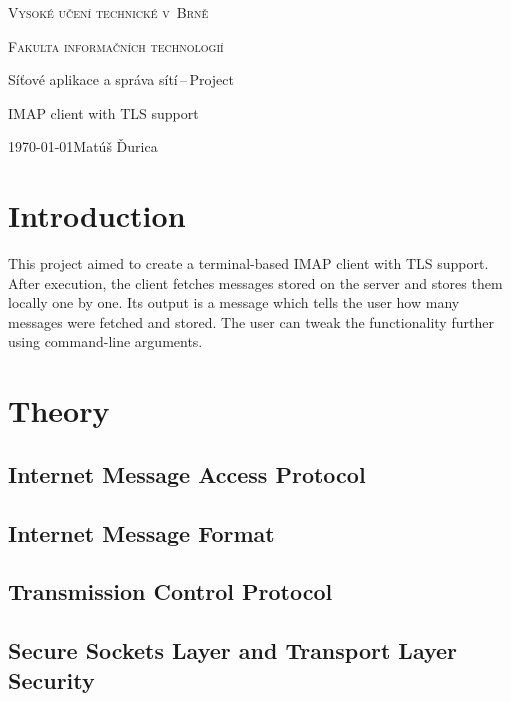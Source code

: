 \documentclass[11pt, a4paper]{article}
\begin{document}
\begin{titlepage}
  \begin{center}
    {\Huge\textsc{Vysoké učení technické v~Brně} \\[0.2em]}

    {\huge{\textsc{Fakulta informačních technologií}}}


    {\LARGE{Síťové aplikace a správa sítí\,--\,Project} \\[0.3em]}

    {\Huge{IMAP client with TLS support}}


  \end{center}
  {\Large \today \hfill Matúš Ďurica}
\end{titlepage}

\tableofcontents
\newpage

\section*{Introduction}

This project aimed to create a terminal-based IMAP client with TLS support. After execution, the client fetches messages stored on the server and stores them locally one by one. Its output is a message which tells the user how many messages were fetched and stored. The user can tweak the functionality further using command-line arguments.

\section{Theory}
\subsection{Internet Message Access Protocol}
\subsection{Internet Message Format}
\subsection{Transmission Control Protocol}
\subsection{Secure Sockets Layer and Transport Layer Security}
\end{document}
